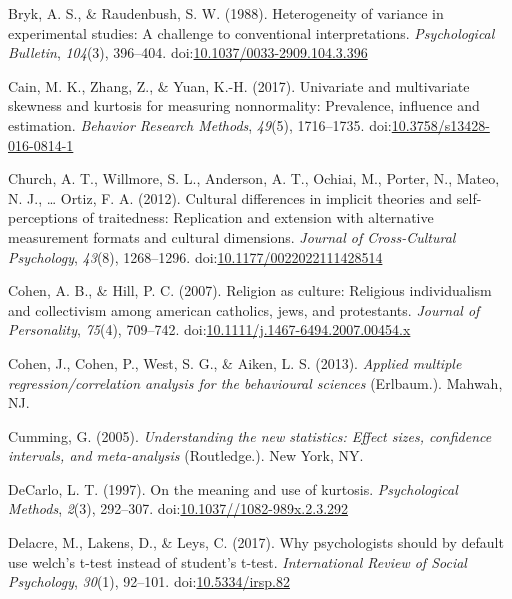\documentclass[man,floatsintext]{apa6}
\begin{document}
\hypertarget{ref-Bryk_and_Raudenbush_1988}{}
Bryk, A. S., \& Raudenbush, S. W. (1988). Heterogeneity of variance in
experimental studies: A challenge to conventional interpretations.
\emph{Psychological Bulletin}, \emph{104}(3), 396--404.
doi:\href{https://doi.org/10.1037/0033-2909.104.3.396}{10.1037/0033-2909.104.3.396}

\hypertarget{ref-Cain_et_al_2016}{}
Cain, M. K., Zhang, Z., \& Yuan, K.-H. (2017). Univariate and
multivariate skewness and kurtosis for measuring nonnormality:
Prevalence, influence and estimation. \emph{Behavior Research Methods},
\emph{49}(5), 1716--1735.
doi:\href{https://doi.org/10.3758/s13428-016-0814-1}{10.3758/s13428-016-0814-1}

\hypertarget{ref-Church_et_al_2012}{}
Church, A. T., Willmore, S. L., Anderson, A. T., Ochiai, M., Porter, N.,
Mateo, N. J., \ldots{} Ortiz, F. A. (2012). Cultural differences in
implicit theories and self-perceptions of traitedness: Replication and
extension with alternative measurement formats and cultural dimensions.
\emph{Journal of Cross-Cultural Psychology}, \emph{43}(8), 1268--1296.
doi:\href{https://doi.org/10.1177/0022022111428514}{10.1177/0022022111428514}

\hypertarget{ref-Cohen_and_Hill_2007}{}
Cohen, A. B., \& Hill, P. C. (2007). Religion as culture: Religious
individualism and collectivism among american catholics, jews, and
protestants. \emph{Journal of Personality}, \emph{75}(4), 709--742.
doi:\href{https://doi.org/10.1111/j.1467-6494.2007.00454.x\%20}{10.1111/j.1467-6494.2007.00454.x }

\hypertarget{ref-Cohen_et_al_2013}{}
Cohen, J., Cohen, P., West, S. G., \& Aiken, L. S. (2013). \emph{Applied
multiple regression/correlation analysis for the behavioural sciences}
(Erlbaum.). Mahwah, NJ.

\hypertarget{ref-Cumming_2013}{}
Cumming, G. (2005). \emph{Understanding the new statistics: Effect
sizes, confidence intervals, and meta-analysis} (Routledge.). New York,
NY.

\hypertarget{ref-DeCarlo_1997}{}
DeCarlo, L. T. (1997). On the meaning and use of kurtosis.
\emph{Psychological Methods}, \emph{2}(3), 292--307.
doi:\href{https://doi.org/10.1037//1082-989x.2.3.292}{10.1037//1082-989x.2.3.292}

\hypertarget{ref-Delacre_et_al_2017}{}
Delacre, M., Lakens, D., \& Leys, C. (2017). Why psychologists should by
default use welch's t-test instead of student's t-test.
\emph{International Review of Social Psychology}, \emph{30}(1), 92--101.
doi:\href{https://doi.org/10.5334/irsp.82}{10.5334/irsp.82}
\end{document}
